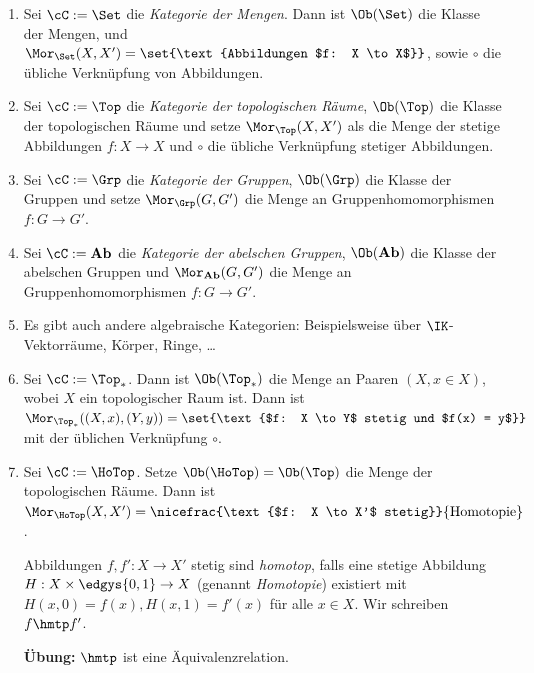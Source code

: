 \documentclass[language=ngerman]{TemplateLecture} %
\begin{document}
\begin{example}
    \begin{enumerate}[$(i)$]
        \item Sei $\cC := \Set$ die \emph{Kategorie der Mengen}. Dann ist $\Ob(\Set)$ die Klasse der Mengen, und $\Mor_{\Set}(X,X') = \set{\text{Abbildungen $f: X \to X$}}$, sowie $\circ$ die übliche Verknüpfung von Abbildungen.
        \item Sei $\cC := \Top$ die \emph{Kategorie der topologischen Räume}, $\Ob(\Top)$ die Klasse der topologischen Räume und setze $\Mor_{\Top}(X,X')$ als die Menge  der stetige Abbildungen $f: X \to X$ und $\circ$ die übliche Verknüpfung stetiger Abbildungen.
        \item Sei $\cC := \Grp$ die \emph{Kategorie der Gruppen}, $\Ob(\Grp)$ die Klasse der Gruppen und setze $\Mor_{\Grp}(G,G')$ die Menge an Gruppenhomomorphismen $f: G \to G'$.
        \item Sei $\cC := \mathbf{Ab}$ die \emph{Kategorie der abelschen Gruppen}, $\Ob(\mathbf{Ab})$ die Klasse der abelschen Gruppen und $\Mor_{\mathbf{Ab}}(G,G')$ die Menge an Gruppenhomomorphismen $f: G \to G'$.
        \item Es gibt auch andere algebraische Kategorien: Beispielsweise über $\IK$-Vektorräume, Körper, Ringe, \dots
        \item Sei $\cC := \Top_*$. Dann ist $\Ob(\Top_*)$ die Menge an Paaren $(X, x \in X)$, wobei $X$ ein topologischer Raum ist. Dann ist $\Mor_{\Top_*}((X,x),(Y,y)) = \set{\text{$f: X \to Y$ stetig und $f(x) = y$}}$ mit der üblichen Verknüpfung $\circ$.
        \item Sei $\cC := \HoTop$. Setze $\Ob(\HoTop) = \Ob(\Top)$ die Menge der topologischen Räume. Dann ist $\Mor_{\HoTop}(X,X') = \nicefrac{\text{$f: X \to X'$ stetig}}{\text{Homotopie}}$.
        \begin{definition}
            Abbildungen $f, f': X \to X'$ stetig sind \emph{homotop}, falls eine stetige Abbildung $H: X \times \edgys{0,1} \to X$ (genannt \emph{Homotopie}) existiert mit $H(x, 0) = f(x), H(x, 1) = f'(x)$ für alle $x \in X$. Wir schreiben $f \hmtp f'$.

        \end{definition}
        \textbf{Übung:} $\hmtp$ ist eine Äquivalenzrelation. 
        

\end{enumerate}
\end{example}
\end{document}
